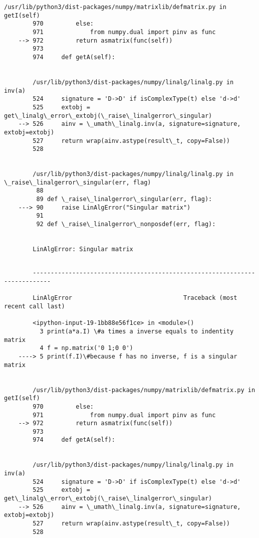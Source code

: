 \documentclass[11pt]{article}
\begin{document}
{\begin{Verbatim}[commandchars=\\\{\}]
        /usr/lib/python3/dist-packages/numpy/matrixlib/defmatrix.py in getI(self)
        970         else:
        971             from numpy.dual import pinv as func
    --> 972         return asmatrix(func(self))
        973 
        974     def getA(self):


        /usr/lib/python3/dist-packages/numpy/linalg/linalg.py in inv(a)
        524     signature = 'D->D' if isComplexType(t) else 'd->d'
        525     extobj = get\_linalg\_error\_extobj(\_raise\_linalgerror\_singular)
    --> 526     ainv = \_umath\_linalg.inv(a, signature=signature, extobj=extobj)
        527     return wrap(ainv.astype(result\_t, copy=False))
        528 


        /usr/lib/python3/dist-packages/numpy/linalg/linalg.py in \_raise\_linalgerror\_singular(err, flag)
         88 
         89 def \_raise\_linalgerror\_singular(err, flag):
    ---> 90     raise LinAlgError("Singular matrix")
         91 
         92 def \_raise\_linalgerror\_nonposdef(err, flag):


        LinAlgError: Singular matrix

    \end{Verbatim}

    \begin{Verbatim}[commandchars=\\\{\}]

        ---------------------------------------------------------------------------

        LinAlgError                               Traceback (most recent call last)

        <ipython-input-19-1bb88e56f1ce> in <module>()
          3 print(a*a.I) \#a times a inverse equals to indentity matrix
          4 f = np.matrix('0 1;0 0')
    ----> 5 print(f.I)\#because f has no inverse, f is a singular matrix
    

        /usr/lib/python3/dist-packages/numpy/matrixlib/defmatrix.py in getI(self)
        970         else:
        971             from numpy.dual import pinv as func
    --> 972         return asmatrix(func(self))
        973 
        974     def getA(self):


        /usr/lib/python3/dist-packages/numpy/linalg/linalg.py in inv(a)
        524     signature = 'D->D' if isComplexType(t) else 'd->d'
        525     extobj = get\_linalg\_error\_extobj(\_raise\_linalgerror\_singular)
    --> 526     ainv = \_umath\_linalg.inv(a, signature=signature, extobj=extobj)
        527     return wrap(ainv.astype(result\_t, copy=False))
        528 



\end{Verbatim}}
\end{document}
